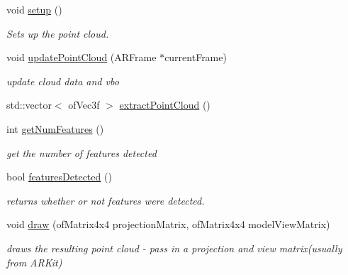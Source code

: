 \begin{DoxyCompactItemize}
\item 
\mbox{\label{class_a_r_debug_utils_1_1_point_cloud_debug_a04e1ac43f026e32bb5b4877d41d69528}} 
void \hyperlink{class_a_r_debug_utils_1_1_point_cloud_debug_a04e1ac43f026e32bb5b4877d41d69528}{setup} ()
\begin{DoxyCompactList}\small\item\em Sets up the point cloud. \end{DoxyCompactList}\item 
\mbox{\label{class_a_r_debug_utils_1_1_point_cloud_debug_a02a8d4c24ec4b19c238288874a568a9f}} 
void \hyperlink{class_a_r_debug_utils_1_1_point_cloud_debug_a02a8d4c24ec4b19c238288874a568a9f}{update\+Point\+Cloud} (A\+R\+Frame $\ast$current\+Frame)
\begin{DoxyCompactList}\small\item\em update cloud data and vbo \end{DoxyCompactList}\item 
std\+::vector$<$ of\+Vec3f $>$ \hyperlink{class_a_r_debug_utils_1_1_point_cloud_debug_ad68fcfdaab9a19a25f37710e0dbcd477}{extract\+Point\+Cloud} ()
\item 
\mbox{\label{class_a_r_debug_utils_1_1_point_cloud_debug_a0757ac82a88433c519ec6362ac8cd251}} 
int \hyperlink{class_a_r_debug_utils_1_1_point_cloud_debug_a0757ac82a88433c519ec6362ac8cd251}{get\+Num\+Features} ()
\begin{DoxyCompactList}\small\item\em get the number of features detected \end{DoxyCompactList}\item 
\mbox{\label{class_a_r_debug_utils_1_1_point_cloud_debug_abfaa58360f92ad1b41692175107c99a8}} 
bool \hyperlink{class_a_r_debug_utils_1_1_point_cloud_debug_abfaa58360f92ad1b41692175107c99a8}{features\+Detected} ()
\begin{DoxyCompactList}\small\item\em returns whether or not features were detected. \end{DoxyCompactList}\item 
\mbox{\label{class_a_r_debug_utils_1_1_point_cloud_debug_a308b87459dd4f0fc89f25bc65ad7b383}} 
void \hyperlink{class_a_r_debug_utils_1_1_point_cloud_debug_a308b87459dd4f0fc89f25bc65ad7b383}{draw} (of\+Matrix4x4 projection\+Matrix, of\+Matrix4x4 model\+View\+Matrix)
\begin{DoxyCompactList}\small\item\em draws the resulting point cloud -\/ pass in a projection and view matrix(usually from A\+R\+Kit) \end{DoxyCompactList}\end{DoxyCompactItemize}


